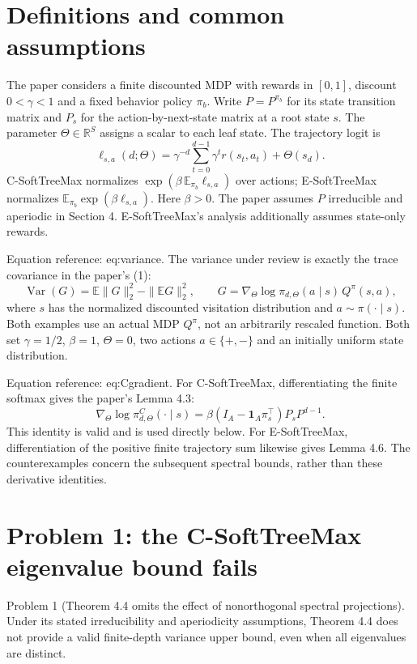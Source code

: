 \documentclass[10pt]{article}
\begin{document}
\section*{Definitions and common assumptions}
The paper considers a finite discounted MDP with rewards in \([0,1]\), discount \(0<\gamma<1\) and a fixed behavior policy \(\pi_b\). Write \(P=P^{\pi_b}\) for its state transition matrix and \(P_s\) for the action-by-next-state matrix at a root state \(s\). The parameter \(\Theta\in\mathbb{R}^S\) assigns a scalar to each leaf state. The trajectory logit is \[\ell_{s,a}(d;\Theta)=
 \gamma^{-d}\sum_{t=0}^{d-1}\gamma^t r(s_t,a_t)+\Theta(s_d).\] C-SoftTreeMax normalizes \(\exp(\beta\,\mathbb{E}_{\pi_b}\ell_{s,a})\) over actions; E-SoftTreeMax normalizes \(\mathbb{E}_{\pi_b}\exp(\beta\ell_{s,a})\). Here \(\beta>0\). The paper assumes \(P\) irreducible and aperiodic in Section 4. E-SoftTreeMax’s analysis additionally assumes state-only rewards.\par
Equation reference: eq:variance. The variance under review is exactly the trace covariance in the paper’s (1): \[
 \operatorname{Var}(G)=\mathbb{E}\|G\|_2^2-\|\mathbb{E}G\|_2^2,\qquad
 G=\nabla_\Theta\log\pi_{d,\Theta}(a\mid s)\,Q^\pi(s,a),\] where \(s\) has the normalized discounted visitation distribution and \(a\sim\pi(\cdot\mid s)\). Both examples use an actual MDP \(Q^\pi\), not an arbitrarily rescaled function. Both set \(\gamma=1/2\), \(\beta=1\), \(\Theta=0\), two actions \(a\in\{+,-\}\) and an initially uniform state distribution.\par
Equation reference: eq:Cgradient. For C-SoftTreeMax, differentiating the finite softmax gives the paper’s Lemma 4.3: \[
 \nabla_\Theta\log\pi^C_{d,\Theta}(\cdot\mid s)
 =\beta(I_A-\mathbf{1}_A\pi_s^\top)P_sP^{d-1}.\] This identity is valid and is used directly below. For E-SoftTreeMax, differentiation of the positive finite trajectory sum likewise gives Lemma 4.6. The counterexamples concern the subsequent spectral bounds, rather than these derivative identities.\par
\section*{Problem 1: the C-SoftTreeMax eigenvalue bound fails}
Problem 1 (Theorem 4.4 omits the effect of nonorthogonal spectral projections).  Under its stated irreducibility and aperiodicity assumptions, Theorem 4.4 does not provide a valid finite-depth variance upper bound, even when all eigenvalues are distinct.\par
\end{document}
